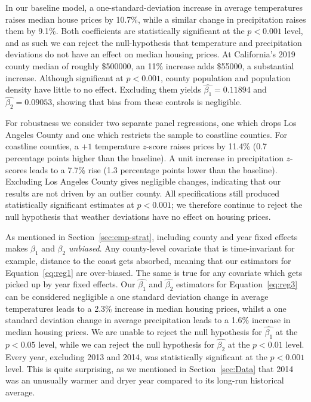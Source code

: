 \documentclass[12pt,reqno]{amsart}
\theoremstyle{definition}
\begin{document}
    

    In our baseline model, a one-standard-deviation increase in average temperatures raises median house prices by 10.7\%, while a similar change in precipitation raises them by 9.1\%. Both coefficients are statistically significant at the $p < 0.001$ level, and as such we can reject the null-hypothesis that temperature and precipitation deviations do not have an effect on median housing prices. At California's 2019 county median of roughly \$500000, an 11\% increase adds \$55000, a substantial increase. Although significant at $p<0.001$, county population and population density have little to no effect. Excluding them yields $\widehat{\beta_1}=0.11894$ and $\widehat{\beta_2}=0.09053$, showing that bias from these controls is negligible.

    

    For robustness we consider two separate panel regressions, one which drops Los Angeles County and one which restricts the sample to coastline counties. For coastline counties, a $+1$ temperature $z$-score raises prices by 11.4\% (0.7 percentage points higher than the baseline). A unit increase in precipitation $z$-scores leads to a 7.7\% rise (1.3 percentage points lower than the baseline). Excluding Los Angeles County gives negligible changes, indicating that our results are not driven by an outlier county. All specifications still produced statistically significant estimates at $p < 0.001$; we therefore continue to reject the null hypothesis that weather deviations have no effect on housing prices.

    As mentioned in Section~\ref{sec:emp-strat}, including county and year fixed effects makes $\beta_1$ and $\beta_2$ \textit{unbiased}. Any county-level covariate that is time-invariant \textemdash for example, distance to the coast \textemdash gets absorbed, meaning that our estimators for Equation~\ref{eq:reg1} are over-biased. The same is true for any covariate which gets picked up by year fixed effects. Our $\widehat{\beta_1}$ and $\widehat{\beta_2}$ estimators for Equation~\ref{eq:reg3} can be considered negligible \textemdash a one standard deviation change in average temperatures leads to a 2.3\% increase in median housing prices, whilst a one standard deviation change in average precipitation leads to a 1.6\% increase in median housing prices. We are unable to reject the null hypothesis for $\widehat{\beta_1}$ at the $p<0.05$ level, while we can reject the null hypothesis for $\widehat{\beta_2}$ at the $p<0.01$ level. Every year, excluding 2013 and 2014, was statistically significant at the $p<0.001$ level. This is quite surprising, as we mentioned in Section~\ref{sec:Data} that 2014 was an unusually warmer and dryer year compared to its long-run historical average.
\end{document}
